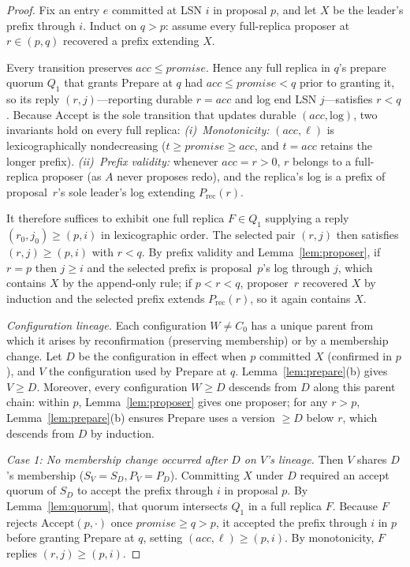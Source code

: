\documentclass[sigconf,nonacm]{acmart}
\newcommand{\acc}{\mathit{acc}}
\begin{document}
\begin{proof}
Fix an entry \(e\) committed at LSN \(i\) in proposal \(p\), and let
\(X\) be the leader's prefix through \(i\). Induct on \(q>p\): assume
every full-replica proposer at \(r\in(p,q)\) recovered a prefix
extending \(X\).

Every transition preserves \(\acc\le\mathit{promise}\). Hence any full
replica in \(q\)'s prepare quorum \(Q_1\) that grants Prepare at \(q\)
had \(\acc\le\mathit{promise}<q\) prior to granting it, so its reply
\((r,j)\)---reporting durable \(r=\acc\) and log end LSN \(j\)---satisfies
\(r<q\). Because \(\mathrm{Accept}\) is the sole transition that updates
durable \((\acc,\mathrm{log})\), two invariants hold on every full
replica:
\emph{(i)~Monotonicity:} \((\acc,\ell)\) is lexicographically
nondecreasing (\(t\ge\mathit{promise}\ge\acc\), and \(t=\acc\) retains
the longer prefix).
\emph{(ii)~Prefix validity:} whenever \(\acc=r>0\), \(r\) belongs to a
full-replica proposer (as \(A\) never proposes redo), and the replica's
log is a prefix of proposal~\(r\)'s sole leader's log extending
\(P_{\mathrm{rec}}(r)\).

It therefore suffices to exhibit one full replica \(F\in Q_1\) supplying
a reply \((r_0,j_0)\ge(p,i)\) in lexicographic order. The selected pair
\((r,j)\) then satisfies \((r,j)\ge(p,i)\) with \(r<q\). By prefix
validity and Lemma~\ref{lem:proposer}, if \(r=p\) then \(j\ge i\) and
the selected prefix is proposal~\(p\)'s log through \(j\), which
contains \(X\) by the append-only rule; if \(p<r<q\), proposer~\(r\)
recovered \(X\) by induction and the selected prefix extends
\(P_{\mathrm{rec}}(r)\), so it again contains \(X\).

\noindent\emph{Configuration lineage.}\enspace
Each configuration \(W\neq C_0\) has a unique parent from which it
arises by reconfirmation (preserving membership) or by a membership
change. Let \(D\) be the configuration in effect when \(p\) committed
\(X\) (confirmed in \(p\)), and \(V\) the configuration used by Prepare
at \(q\). Lemma~\ref{lem:prepare}(b) gives \(V\ge D\). Moreover, every
configuration \(W\ge D\) descends from \(D\) along this parent chain:
within \(p\), Lemma~\ref{lem:proposer} gives one proposer; for any
\(r>p\), Lemma~\ref{lem:prepare}(b) ensures Prepare uses a version
\(\ge D\) below \(r\), which descends from \(D\) by induction.

\emph{Case 1: No membership change occurred after \(D\) on \(V\)'s
lineage.}
Then \(V\) shares \(D\)'s membership (\(S_V=S_D, P_V=P_D\)).
Committing \(X\) under \(D\) required an accept quorum of \(S_D\) to
accept the prefix through \(i\) in proposal \(p\). By
Lemma~\ref{lem:quorum}, that quorum intersects \(Q_1\) in a full replica
\(F\). Because \(F\) rejects \(\mathrm{Accept}(p,\cdot)\) once
\(\mathit{promise}\ge q>p\), it accepted the prefix through \(i\) in
\(p\) before granting Prepare at \(q\), setting \((\acc,\ell)\ge(p,i)\).
By monotonicity, \(F\) replies \((r,j)\ge(p,i)\).


\end{proof}
\end{document}
